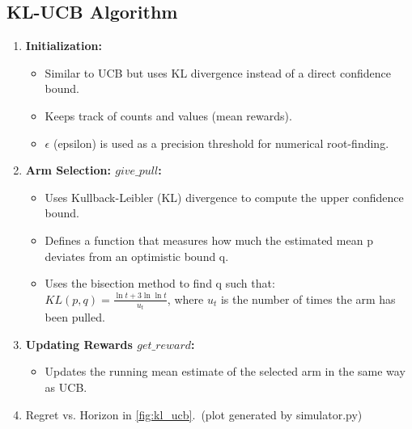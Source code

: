 \documentclass{article}
\begin{document}
    \subsection{KL-UCB Algorithm}
    \begin{enumerate}
        \item \textbf{Initialization:} \begin{itemize}
            \item Similar to UCB but uses KL divergence instead of a direct confidence bound.
            \item Keeps track of counts and values (mean rewards).
            \item $\epsilon$ (epsilon) is used as a precision threshold for numerical root-finding.
        \end{itemize}

        \item \textbf{Arm Selection: \(give\_pull\):} \begin{itemize}
            \item Uses Kullback-Leibler (KL) divergence to compute the upper confidence bound.
            \item Defines a function that measures how much the estimated mean p deviates from an optimistic bound q.
            \item Uses the bisection method to find q such that: \\ $KL(p,q) = \frac{\ln{t} + 3 \ln{\ln{t}}}{u_t}$, where $u_t$ is the number of times the arm has been pulled.
        \end{itemize}


        \item \textbf{Updating Rewards \(get\_reward\):} \begin{itemize}
            \item Updates the running mean estimate of the selected arm in the same way as UCB.
        \end{itemize}

        \item Regret vs. Horizon in \autoref{fig:kl_ucb}.\ (plot generated by simulator.py)
    \end{enumerate}
\end{document}
